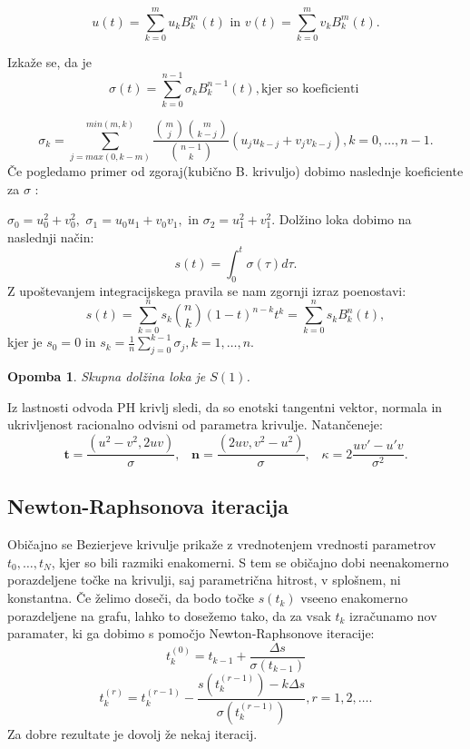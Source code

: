 \documentclass[12pt]{article}
\newtheorem{Opomba}[Izrek]{{\sc Opomba}}
\begin{document}
	$$u (t)=\sum_{k=0}^m u_kB_k^m(t) \text{ in } v (t) =\sum_{k=0}^m v_kB_k^m(t).$$
	

Izkaže se, da je 
$$\sigma (t) =\sum_{k=0}^{n-1} \sigma_kB_k^{n-1}(t), \text{kjer so koeficienti }$$ 

$$\sigma_k =\sum_{j=max(0,k-m)}^{min(m,k)}\frac{\binom{m}{j}\binom{m}{k-j}}{\binom{n-1}{k}}(u_ju_{k-j}+v_jv_{k-j}), k = 0,\ldots , n - 1.$$
\newline
Če pogledamo primer od zgoraj(kubično B. krivuljo) dobimo naslednje koeficiente za $\sigma $ :

$\sigma_0 = u^2_0+ v^2_0, $
$\sigma_1 = u_0u_1 + v_0v_1,$ in  
$\sigma_2 = u^2_1+ v^2_1.$
\newline
Dolžino loka dobimo na naslednji način:
$$s (t) =\int^t_0\sigma(\tau) d\tau.$$
Z upoštevanjem integracijskega pravila se nam zgornji izraz poenostavi: 
$$s (t) =\sum^n_{k=0}s_k\binom{n}{k}(1-t)^{n-k}t^k=\sum_{k=0}^n s_kB^n_k(t),$$
kjer je $s_0=0$ in $s_k=\frac{1}{n}\sum^{k-1}_{j=0}\sigma_j, k=1,\ldots,n.$
\begin{Opomba}
	Skupna dolžina loka je $S(1)$. 
\end{Opomba}

Iz lastnosti odvoda PH krivlj sledi, da so enotski tangentni vektor,
normala in ukrivljenost racionalno odvisni od parametra krivulje. Natančeneje: 
$$\textbf{t} =\frac{(u^2 - v^2, 2uv)}{\sigma},\hspace{10pt} \textbf{n} =\frac{(2uv, v^2 - u^2)}{\sigma},\hspace{10pt} \kappa = 2 \frac{uv\prime - u\prime v}{\sigma^2}.$$

\subsection*{Newton-Raphsonova iteracija}
Običajno se Bezierjeve krivulje prikaže z vrednotenjem vrednosti parametrov  $t_0,\ldots , t_N$, kjer so bili razmiki enakomerni.
S tem se običajno dobi neenakomerno porazdeljene točke na krivulji, saj parametrična 
hitrost, v splošnem, ni konstantna.
Če želimo doseči, da bodo točke $s(t_k)$ vseeno enakomerno porazdeljene na grafu,
lahko to dosežemo tako, da za vsak $t_k$ izračunamo nov paramater, ki ga dobimo 
s pomočjo Newton-Raphsonove iteracije: 
$$t^{(0)}_k = t_{k-1}+\frac{\Delta s}{\sigma(t_{k-1})}$$
$$t^{(r)}_k = t^{(r-1)}_k-\frac{s(t^{(r-1)}_k)-k\Delta s}{\sigma(t^{(r-1)}_k)}, r = 1, 2,\ldots.$$
Za dobre rezultate je dovolj že nekaj iteracij.
\end{document}
